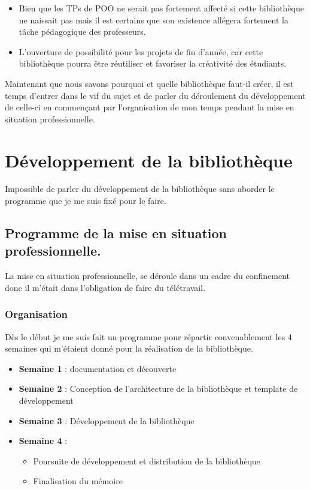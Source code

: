 \documentclass[11pt,a4paper,krantz2,11pt,oneside]{krantz}
\providecommand{\tightlist}{%
  \setlength{\itemsep}{0pt}\setlength{\parskip}{0pt}}
\begin{document}
\begin{itemize}
\item
  Bien que les TPs de POO ne serait pas fortement affecté si cette bibliothèque ne naissait pas mais il est certains que son existence allégera fortement la tâche pédagogique des professeurs.
\item
  L'ouverture de possibilité pour les projets de fin d'année, car cette bibliothèque pourra être réutiliser et favoriser la créativité des étudiants.
\end{itemize}

Maintenant que nous savons pourquoi et quelle bibliothèque faut-il créer, il est temps d'entrer dans le vif du sujet et de parler du déroulement du développement de celle-ci en commençant par l'organisation de mon temps pendant la mise en situation professionnelle.

\hypertarget{dev}{%
\chapter{Développement de la bibliothèque}\label{dev}}

Impossible de parler du développement de la bibliothèque sans aborder le programme que je me suis fixé pour le faire.

\hypertarget{programme-de-la-mise-en-situation-professionnelle.}{%
\section{Programme de la mise en situation professionnelle.}\label{programme-de-la-mise-en-situation-professionnelle.}}

La mise en situation professionnelle, se déroule dans un cadre du confinement donc il m'était dans l'obligation de faire du télétravail.

\hypertarget{organisation}{%
\subsection{Organisation}\label{organisation}}

Dès le début je me suis fait un programme pour répartir convenablement les 4 semaines qui m'étaient donné pour la réalisation de la bibliothèque.

\begin{itemize}
\tightlist
\item
  \textbf{Semaine 1} : documentation et découverte
\item
  \textbf{Semaine 2} : Conception de l'architecture de la bibliothèque et template de développement
\item
  \textbf{Semaine 3} : Développement de la bibliothèque
\item
  \textbf{Semaine 4} :

  \begin{itemize}
  \tightlist
  \item
    Poursuite de développement et distribution de la bibliothèque
  \item
    Finalisation du mémoire
  \end{itemize}
\end{itemize}
\end{document}
